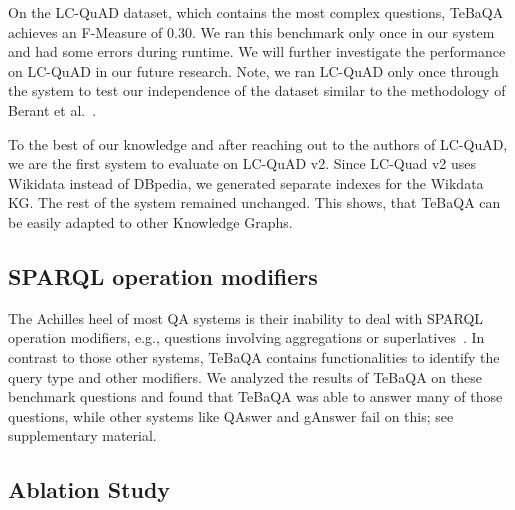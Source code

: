 \documentclass{IOS-Book-Article}
\begin{document}
On the LC-QuAD dataset, which contains the most complex questions, TeBaQA achieves an F-Measure of 0.30. We ran this benchmark only once in our system and had some errors during runtime. We will further investigate the performance on LC-QuAD in our future research.
Note, we ran LC-QuAD only once through the system to test our independence of the dataset similar to the methodology of Berant et al.~\cite{wang-etal-2015-building}.

To the best of our knowledge and after reaching out to the authors of LC-QuAD, we are the first system to evaluate on LC-QuAD v2. Since LC-Quad v2 uses Wikidata instead of DBpedia, we generated separate indexes for the Wikdata KG. The rest of the system remained unchanged. This shows, that TeBaQA can be easily adapted to other Knowledge Graphs.

\subsection{SPARQL operation modifiers}

The Achilles heel of most QA systems is their inability to deal with SPARQL operation modifiers, e.g., questions involving aggregations or superlatives~\cite{DBLP:conf/semweb/0002DUN17}.
In contrast to those other systems, TeBaQA contains functionalities to identify the query type and other modifiers. 
We analyzed the results of TeBaQA on these benchmark questions and found that TeBaQA was able to answer many of those questions, while other systems like QAswer and gAnswer fail on this; see supplementary material. 

\subsection{Ablation Study} \label{ablation}

\begin{table}[htb!]
    \setlength{\tabcolsep}{6pt}
	\centering
	\caption{Ablation study for TeBaQA on the QALD-9 test benchmark.}
	\label{table:ablation_study}
\end{table}
\end{document}
